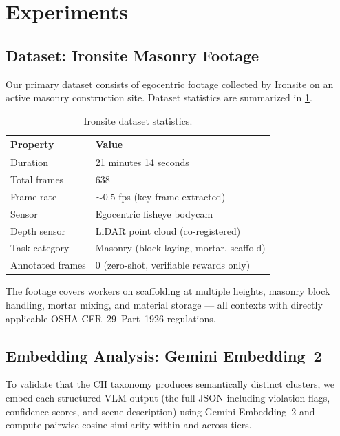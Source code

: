 \documentclass[sigconf,nonacm]{acmart}
\begin{document}
\section{Experiments}
\label{sec:experiments}

\subsection{Dataset: Ironsite Masonry Footage}
\label{sec:dataset}

Our primary dataset consists of egocentric footage collected by Ironsite
on an active masonry construction site.
Dataset statistics are summarized in \cref{tab:dataset}.

\begin{table}[t]
  \centering
  \caption{Ironsite dataset statistics.}
  \label{tab:dataset}
  \begin{tabular}{@{}ll@{}}
    \toprule
    \textbf{Property} & \textbf{Value} \\
    \midrule
    Duration          & 21 minutes 14 seconds \\
    Total frames      & 638 \\
    Frame rate        & $\sim$0.5 fps (key-frame extracted) \\
    Sensor            & Egocentric fisheye bodycam \\
    Depth sensor      & LiDAR point cloud (co-registered) \\
    Task category     & Masonry (block laying, mortar, scaffold) \\
    Annotated frames  & 0 (zero-shot, verifiable rewards only) \\
    \bottomrule
  \end{tabular}
\end{table}

The footage covers workers on scaffolding at multiple heights, masonry
block handling, mortar mixing, and material storage --- all contexts
with directly applicable OSHA CFR~29~Part~1926 regulations.

\subsection{Embedding Analysis: Gemini Embedding~2}
\label{sec:embedding}

To validate that the CII taxonomy produces semantically distinct clusters,
we embed each structured VLM output (the full JSON including violation
flags, confidence scores, and scene description) using Gemini Embedding~2
and compute pairwise cosine similarity within and across tiers.
\end{document}
